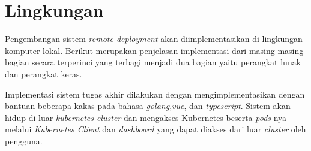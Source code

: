 \section{Lingkungan}

Pengembangan sistem \textit{remote deployment} akan diimplementasikan di lingkungan komputer lokal. Berikut merupakan penjelasan implementasi dari masing masing bagian secara terperinci yang terbagi menjadi dua bagian yaitu perangkat lunak dan perangkat keras.

Implementasi sistem tugas akhir dilakukan dengan mengimplementasikan dengan bantuan beberapa kakas pada bahasa \textit{golang},\textit{vue}, dan \textit{typescript}. Sistem akan hidup di luar \textit{kubernetes cluster} dan mengakses Kubernetes beserta \textit{pods}-nya melalui \textit{Kubernetes Client} dan \textit{dashboard} yang dapat diakses dari luar \textit{cluster} oleh pengguna.

